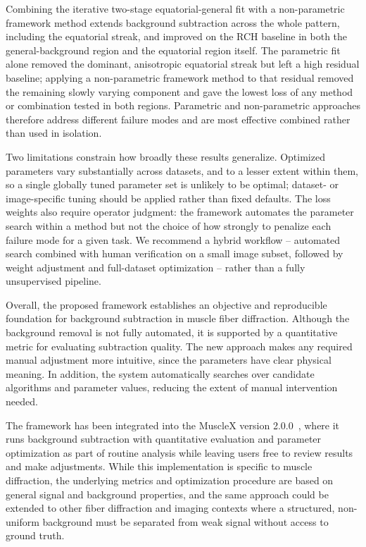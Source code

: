 \documentclass[iucr]{iucrjournals}
\begin{document}
Combining the iterative two-stage equatorial-general fit with a non-parametric framework method extends background subtraction across the whole pattern, including the equatorial streak, and improved on the RCH baseline in both the general-background region and the equatorial region itself. The parametric fit alone removed the dominant, anisotropic equatorial streak but left a high residual baseline; applying a non-parametric framework method to that residual removed the remaining slowly varying component and gave the lowest loss of any method or combination tested in both regions. Parametric and non-parametric approaches therefore address different failure modes and are most effective combined rather than used in isolation.

Two limitations constrain how broadly these results generalize. Optimized parameters vary substantially across datasets, and to a lesser extent within them, so a single globally tuned parameter set is unlikely to be optimal; dataset- or image-specific tuning should be applied rather than fixed defaults. The loss weights also require operator judgment: the framework automates the parameter search within a method but not the choice of how strongly to penalize each failure mode for a given task. We recommend a hybrid workflow -- automated search combined with human verification on a small image subset, followed by weight adjustment and full-dataset optimization -- rather than a fully unsupervised pipeline.

Overall, the proposed framework establishes an objective and reproducible foundation for background subtraction in muscle fiber diffraction. Although the background removal is not fully automated, it is supported by a quantitative metric for evaluating subtraction quality. The new approach makes any required manual adjustment more intuitive, since the parameters have clear physical meaning. In addition, the system automatically searches over candidate algorithms and parameter values, reducing the extent of manual intervention needed.

The framework has been integrated into the MuscleX version 2.0.0~\cite{lee2019musclex}, where it runs background subtraction with quantitative evaluation and parameter optimization as part of routine analysis while leaving users free to review results and make adjustments. While  this implementation is specific to muscle diffraction, the underlying metrics and optimization procedure are based on general signal and background properties, and the same approach could be extended to other fiber diffraction and imaging contexts where a structured, non-uniform background must be separated from weak signal without access to ground truth.
\end{document}
